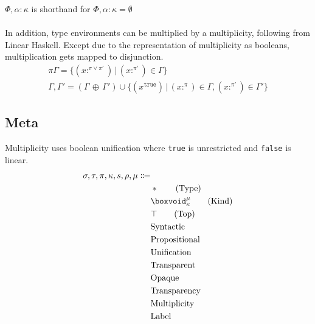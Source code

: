 \documentclass {article}
\begin{document}
$ \Phi, \alpha : \kappa $ is shorthand for $ \Phi, \alpha : \kappa = \emptyset $ \\
\\
In addition, type environments can be multiplied by a multiplicity, following from Linear Haskell.
Except due to the representation of multiplicity as booleans, multiplication gets mapped to disjunction.
\begin{gather*}
\pi \Gamma = \{(x :^{\pi \lor  \pi'}) \, | \, (x :^{\pi'}) \in \Gamma \} \\
\Gamma, \Gamma' = (\Gamma \, \oplus \, \Gamma') \cup \{ (x^\texttt{true}) \, | \, (x :^\pi) \in \Gamma, (x :^{\pi'}) \in \Gamma' \}
\end{gather*}

\subsection{Meta}
Multiplicity uses boolean unification where \texttt{true} is unrestricted and \texttt{false} is linear.
\begin{align*}
\sigma, \tau, \pi, \kappa, s, \rho, \mu \Coloneqq & \\
& * \tag{Type} \\
& \boxvoid^\mu_{\kappa} \tag{Kind} \\
& \top \tag{Top} \\
& \text{Syntactic} \\
& \text{Propositional} \\
& \text{Unification} \\
& \text{Transparent} \\
& \text{Opaque} \\
& \text{Transparency} \\
& \text{Multiplicity} \\
& \text{Label}
\end{align*}
\end{document}
